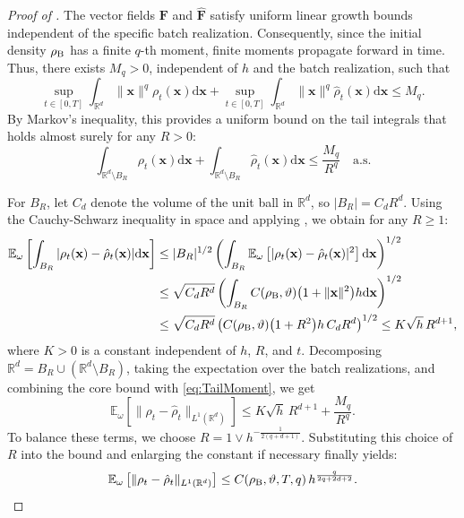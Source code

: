 \documentclass[twoside,11pt]{article}
\theoremstyle{plain}
\def\R{\mathbb R}
\def\E{\mathbb E}
\newcommand{\diff}{\mathrm{d}}
\newcommand{\bfF}{\mathbf{F}}
\newcommand{\bfx}{\mathbf{x}}
\begin{document}
\begin{proof}[Proof of ]
The vector fields $\bfF$ and $\hat{\bfF}$ satisfy uniform linear growth bounds independent of the specific batch realization. Consequently, since the initial density $\rho_{\rm B}$ has a finite $q$-th moment, finite moments propagate forward in time. Thus, there exists $M_q>0$, independent of $h$ and the batch realization, such that
\begin{equation}\label{eq:MomentBound}
\sup_{t\in[0,T]} \int_{\R^d}\|\bfx\|^q\rho_t(\bfx)\diff\bfx + \sup_{t\in[0,T]} \int_{\R^d}\|\bfx\|^q\hat\rho_t(\bfx)\diff\bfx \le M_q.
\end{equation}
By Markov's inequality, this provides a uniform bound on the tail integrals that holds almost surely for any $R>0$:
\begin{equation}\label{eq:TailMoment}
\int_{\R^d\setminus B_R}\rho_t(\bfx)\diff\bfx + \int_{\R^d\setminus B_R}\hat\rho_t(\bfx)\diff\bfx \le \frac{M_q}{R^q} \quad \text{a.s.}
\end{equation}

For $B_R$, let $C_d$ denote the volume of the unit ball in $\R^d$, so $|B_R| = C_d R^d$. Using the Cauchy-Schwarz inequality in space and applying , we obtain for any $R\ge1$:
\begin{align*}
\E_{\omega}\left[ \int_{B_R}|\rho_t(\bfx)-\hat\rho_t(\bfx)|\diff\bfx \right] 
&\le |B_R|^{1/2} \left( \int_{B_R} \E_{\omega}\left[ |\rho_t(\bfx)-\hat\rho_t(\bfx)|^2 \right]\diff\bfx \right)^{1/2} \\
&\le \sqrt{C_d R^d} \left( \int_{B_R} C(\rho_{\rm B},\vartheta)\big(1+\|\bfx\|^2\big)h \diff\bfx \right)^{1/2} \\
&\le \sqrt{C_d R^d} \left( C(\rho_{\rm B},\vartheta)\big(1+R^2\big) h \, C_d R^d \right)^{1/2}\le K \sqrt{h} \, R^{d+1},
\end{align*}
where $K>0$ is a constant independent of $h$, $R$, and $t$. Decomposing $\R^d = B_R \cup (\R^d\setminus B_R)$, taking the expectation over the batch realizations, and combining the core bound with \eqref{eq:TailMoment}, we get
\begin{equation*}
\E_{\omega}\left[\|\rho_t-\hat\rho_t\|_{L^1(\R^d)}\right] \le K\sqrt{h} \, R^{d+1} + \frac{M_q}{R^q}.
\end{equation*}
To balance these terms, we choose $R = 1\vee h^{-\frac{1}{2(q+d+1)}}$. Substituting this choice of $R$ into the bound and enlarging the constant if necessary finally yields:
\begin{equation*}
\E_{\omega}\left[\|\rho_t-\hat\rho_t\|_{L^1(\R^d)}\right] \le C(\rho_{\rm B},\vartheta,T,q) \, h^{\frac{q}{2q+2d+2}}.
\end{equation*}


\end{proof}
\end{document}
